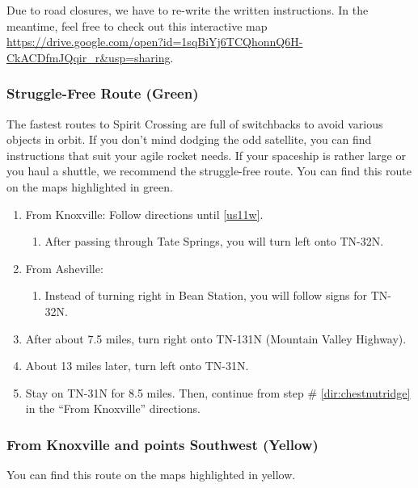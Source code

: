 Due to road closures, we have to re-write the written instructions.
In the meantime, feel free to check out this interactive map \url{https://drive.google.com/open?id=1sqBiYj6TCQhonnQ6H-CkACDfmJQqir_r&usp=sharing}.

\subsubsection*{Struggle-Free Route (Green)}
The fastest routes to Spirit Crossing are full of switchbacks to avoid various objects in orbit. If you don't mind dodging the odd satellite, you can find instructions that suit your agile rocket needs. If your spaceship is rather large or you haul a shuttle, we recommend the struggle-free route. You can find this route on the maps highlighted in green.

\begin{enumerate}[noitemsep]
	\item From Knoxville: Follow directions until \ref{us11w}.
	\begin{enumerate}
	    \item After passing through Tate Springs, you will turn left onto TN-32N.
	\end{enumerate}
    \item From Asheville:
    \begin{enumerate}
        \item Instead of turning right in Bean Station, you will follow signs for TN-32N.
    \end{enumerate}
    \item After about 7.5 miles, turn right onto TN-131N (Mountain Valley Highway). 
    \item About 13 miles later, turn left onto TN-31N.
    \item Stay on TN-31N for 8.5 miles. Then, continue from step \# \ref{dir:chestnutridge} in the ``From Knoxville'' directions.
\end{enumerate}

\subsubsection*{From Knoxville and points Southwest (Yellow)}
You can find this route on the maps highlighted in yellow.

